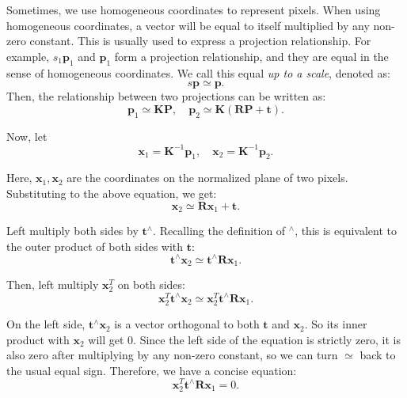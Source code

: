 Sometimes, we use homogeneous coordinates to represent pixels. When using homogeneous coordinates, a vector will be equal to itself multiplied by any non-zero constant. This is usually used to express a projection relationship. For example, $s_1 \mathbf{p}_1$ and $\mathbf{p}_1$ form a projection relationship, and they are equal in the sense of homogeneous coordinates. We call this equal \textit{up to a scale}, denoted as:
\begin{equation}
s\mathbf{p} \simeq \mathbf{p}.
\end{equation}
Then, the relationship between two projections can be written as:
\begin{equation}
 {\mathbf{p}_1} \simeq \mathbf{KP},\quad \mathbf{p}_2 \simeq \mathbf{K}\left( \mathbf{RP + t} \right).
\end{equation}

Now, let
\begin{equation}
{\mathbf{x}_1} = {\mathbf{K}^{ - 1}}{\mathbf{p}_1}, \quad {\mathbf{x}_2} = {\mathbf{K}^{ - 1}}{\mathbf{p}_2}.
\end{equation}

Here, $\mathbf{x}_1, \mathbf{x}_2$ are the coordinates on the normalized plane of two pixels. Substituting to the above equation, we get:
\begin{equation}
{\mathbf{x}_2} \simeq \mathbf{R} {\mathbf{x}_1} + \mathbf{t}.
\end{equation}

Left multiply both sides by $\mathbf{t}^\wedge$. Recalling the definition of $^\wedge$, this is equivalent to the outer product of both sides with $\mathbf{t}$:
\begin{equation}
\mathbf{t}^\wedge \mathbf{x}_2 \simeq \mathbf{t}^\wedge \mathbf{R} \mathbf{x}_1.
\end{equation}

Then, left multiply $\mathbf{x}_2^T$ on both sides:
\begin{equation}
\mathbf{x}_2^T \mathbf{t}^\wedge \mathbf{x}_2 \simeq \mathbf{x}_2^T \mathbf{t}^\wedge \mathbf{R} \mathbf{x}_1.
\end{equation}

On the left side, $\mathbf{t}^\wedge \mathbf{x}_2$ is a vector orthogonal to both $\mathbf{t}$ and $\mathbf{x}_2$. So its inner product with $\mathbf{x}_2$ will get 0. Since the left side of the equation is strictly zero, it is also zero after multiplying by any non-zero constant, so we can turn $\simeq$ back to the usual equal sign. Therefore, we have a concise equation:
\begin{equation}
\mathbf{x}_2^T \mathbf{t}^\wedge \mathbf{R} \mathbf{x}_1 = 0.
\end{equation}

